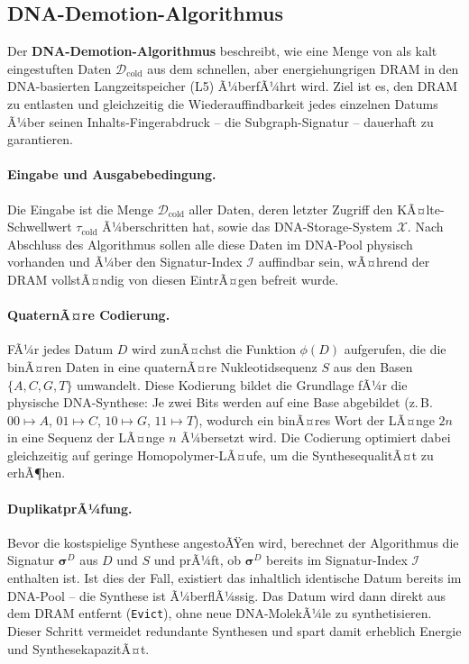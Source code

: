 ﻿\documentclass[a4paper,12pt]{article}
\theoremstyle{definition}
\begin{document}
\subsection{DNA-Demotion-Algorithmus}

Der \textbf{DNA-Demotion-Algorithmus} beschreibt, wie eine Menge von als kalt eingestuften Daten $\mathcal{D}_{\mathrm{cold}}$ aus dem schnellen, aber energiehungrigen DRAM in den DNA-basierten Langzeitspeicher (L5) Ã¼berfÃ¼hrt wird. Ziel ist es, den DRAM zu entlasten und gleichzeitig die Wiederauffindbarkeit jedes einzelnen Datums Ã¼ber seinen Inhalts-Fingerabdruck -- die Subgraph-Signatur -- dauerhaft zu garantieren.

\paragraph{Eingabe und Ausgabebedingung.}
Die Eingabe ist die Menge $\mathcal{D}_{\mathrm{cold}}$ aller Daten, deren letzter Zugriff den KÃ¤lte-Schwellwert $\tau_{\mathrm{cold}}$ Ã¼berschritten hat, sowie das DNA-Storage-System $\mathcal{X}$. Nach Abschluss des Algorithmus sollen alle diese Daten im DNA-Pool physisch vorhanden und Ã¼ber den Signatur-Index $\mathcal{I}$ auffindbar sein, wÃ¤hrend der DRAM vollstÃ¤ndig von diesen EintrÃ¤gen befreit wurde.

\paragraph{QuaternÃ¤re Codierung.}
FÃ¼r jedes Datum $D$ wird zunÃ¤chst die Funktion $\phi(D)$ aufgerufen, die die binÃ¤ren Daten in eine quaternÃ¤re Nukleotidsequenz $S$ aus den Basen $\{A, C, G, T\}$ umwandelt. Diese Kodierung bildet die Grundlage fÃ¼r die physische DNA-Synthese: Je zwei Bits werden auf eine Base abgebildet (z.\,B. $00 \mapsto A$, $01 \mapsto C$, $10 \mapsto G$, $11 \mapsto T$), wodurch ein binÃ¤res Wort der LÃ¤nge $2n$ in eine Sequenz der LÃ¤nge $n$ Ã¼bersetzt wird. Die Codierung optimiert dabei gleichzeitig auf geringe Homopolymer-LÃ¤ufe, um die SynthesequalitÃ¤t zu erhÃ¶hen.

\paragraph{DuplikatprÃ¼fung.}
Bevor die kostspielige Synthese angestoÃŸen wird, berechnet der Algorithmus die Signatur $\boldsymbol{\sigma}^D$ aus $D$ und $S$ und prÃ¼ft, ob $\boldsymbol{\sigma}^D$ bereits im Signatur-Index $\mathcal{I}$ enthalten ist. Ist dies der Fall, existiert das inhaltlich identische Datum bereits im DNA-Pool -- die Synthese ist Ã¼berflÃ¼ssig. Das Datum wird dann direkt aus dem DRAM entfernt (\texttt{Evict}), ohne neue DNA-MolekÃ¼le zu synthetisieren. Dieser Schritt vermeidet redundante Synthesen und spart damit erheblich Energie und SynthesekapazitÃ¤t.
\end{document}
